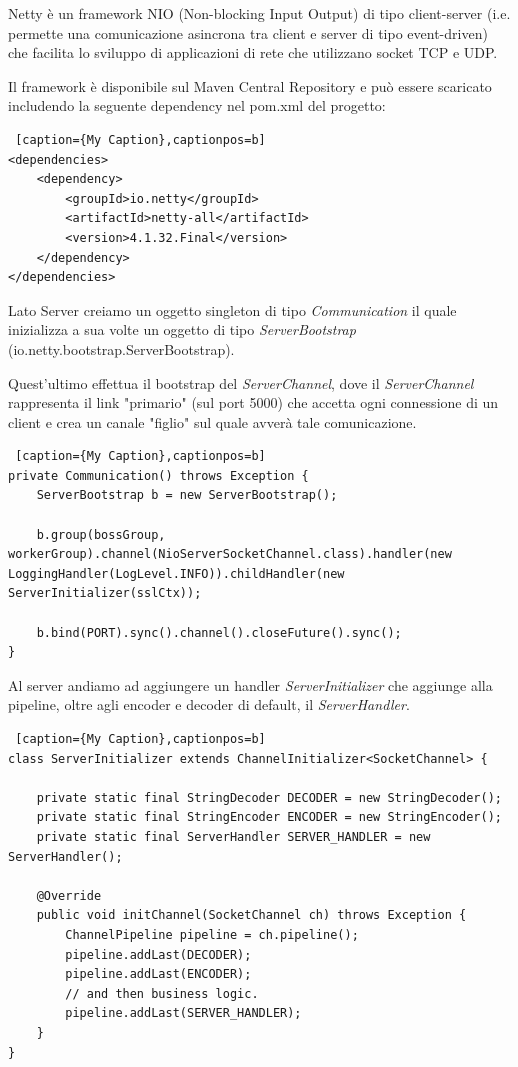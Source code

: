 Netty è un framework NIO (Non-blocking Input Output) di tipo client-server (i.e. permette una comunicazione asincrona tra client e server di tipo event-driven) che facilita lo sviluppo di applicazioni di rete che utilizzano socket TCP e UDP.

Il framework è disponibile sul Maven Central Repository e può essere scaricato includendo la seguente dependency nel pom.xml del progetto:
\begin{lstlisting} [caption={My Caption},captionpos=b]
<dependencies>
	<dependency>
		<groupId>io.netty</groupId>
		<artifactId>netty-all</artifactId>
		<version>4.1.32.Final</version>
	</dependency>
</dependencies>
\end{lstlisting}

Lato Server creiamo un oggetto singleton di tipo \textit{Communication} il quale inizializza a sua volte un oggetto di tipo \textit{ServerBootstrap} (io.netty.bootstrap.ServerBootstrap).

Quest'ultimo effettua il bootstrap del \textit{ServerChannel}, dove il \textit{ServerChannel} rappresenta il link "primario" (sul port 5000) che accetta ogni connessione di un client e crea un canale "figlio" sul quale avverà tale comunicazione.

\begin{lstlisting} [caption={My Caption},captionpos=b]
private Communication() throws Exception {
	ServerBootstrap b = new ServerBootstrap();

	b.group(bossGroup, workerGroup).channel(NioServerSocketChannel.class).handler(new LoggingHandler(LogLevel.INFO)).childHandler(new ServerInitializer(sslCtx));

	b.bind(PORT).sync().channel().closeFuture().sync();
}
\end{lstlisting}

Al server andiamo ad aggiungere un handler \textit{ServerInitializer} che aggiunge alla pipeline, oltre agli encoder e decoder di default, il \textit{ServerHandler}.

\begin{lstlisting} [caption={My Caption},captionpos=b]
class ServerInitializer extends ChannelInitializer<SocketChannel> {

	private static final StringDecoder DECODER = new StringDecoder();
	private static final StringEncoder ENCODER = new StringEncoder();
	private static final ServerHandler SERVER_HANDLER = new ServerHandler();
	
	@Override
	public void initChannel(SocketChannel ch) throws Exception {
		ChannelPipeline pipeline = ch.pipeline();
		pipeline.addLast(DECODER);
		pipeline.addLast(ENCODER);
		// and then business logic.
		pipeline.addLast(SERVER_HANDLER);
	}
}
\end{lstlisting}

